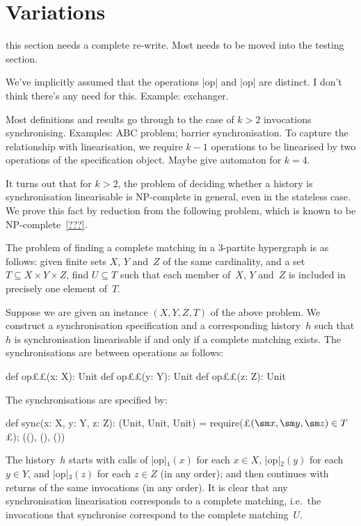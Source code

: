 \section{Variations}
\label{sec:variations}

 this section needs a complete re-write.  Most needs to be
moved into the testing section.

We've implicitly assumed that the operations |op| and |op| are
distinct.  I don't think there's any need for this.  Example: exchanger.  

Most definitions and results go through to the case of $k > 2$ invocations
synchronising.  Examples: ABC problem; barrier synchronisation.  To capture
the relationship with linearisation, we require $k-1$ operations to be
linearised by two operations of the specification object.  Maybe give
automaton for $k = 4$.  

It turns out that for $k > 2$, the problem of deciding whether a history is
synchronisation linearisable is NP-complete in general, even in the stateless
case.  We prove this fact by reduction from the following problem, which is
known to be NP-complete~\ref{???}.
%
\begin{definition}
The problem of finding a complete matching in a 3-partite hypergraph is as
follows: given finite sets $X$, $Y$ and~$Z$ of the same cardinality, and a set
$T \subseteq X \times Y \times Z$, find $U \subseteq T$ such that each member
of~$X$, $Y$ and~$Z$ is included in precisely one element of~$T$.
\end{definition}

Suppose we are given an instance $(X, Y, Z, T)$ of the above problem.  We
construct a synchronisation specification and a corresponding history~$h$ such
that $h$ is synchronisation linearisable if and only if a complete matching
exists.  The synchronisations are between operations as follows:
\begin{scala}
  def op££(x: X): Unit
  def op££(y: Y): Unit
  def op££(z: Z): Unit
\end{scala}
%
The synchronisations are specified by:
%
\begin{scala}
  def sync(x: X, y: Y, z: Z): (Unit, Unit, Unit) = {
    require(£$(\sm x, \sm y, \sm z) \in T$£); ((), (), ())
  }
\end{scala}
%
The history~$h$ starts with calls of |op|$_1(x)$ for each $x \in X$,
|op|$_2(y)$ for each $y \in Y$, and |op|$_3(z)$ for each $z \in Z$ (in any
order); and then continues with returns of the same invocations (in any
order).  It is clear that any synchronisation linearisation corresponds to a
complete matching, i.e.~the invocations that synchronise correspond to the
complete matching~$U$.

